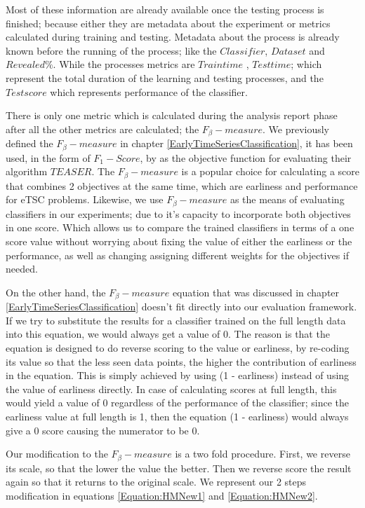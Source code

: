 Most of these information are already available once the testing process is finished; because either they are metadata about the experiment or metrics calculated during training and testing.
Metadata about the process is already known before the running of the process; like the $Classifier$, $Data set$ and $Revealed \%$.
While the processes metrics are $Train time$ , $Test time$; which represent the total duration of the learning and testing processes, and the $Test score$ which represents performance of the classifier.


There is only one metric which is calculated during the analysis report phase after all the other metrics are calculated; the $F_{\beta}-measure$.
We previously defined the $F_{\beta}-measure$ in chapter \ref{EarlyTimeSeriesClassification}, it has been used, in the form of $F_{1}-Score$, by \cite{schafer2020teaser} as the objective function for evaluating their algorithm $TEASER$.
The $F_{\beta}-measure$ is a popular choice for calculating a score that combines 2 objectives at the same time, which are earliness and performance for eTSC problems.
Likewise, we use $F_{\beta}-measure$ as the means of evaluating classifiers in our experiments; due to it's capacity to incorporate both objectives in one score.
Which allows us to compare the trained classifiers in terms of a one score value without worrying about fixing the value of either the earliness or the performance,
as well as changing assigning different weights for the objectives if needed.


On the other hand, the $F_{\beta}-measure$ equation that was discussed in chapter \ref{EarlyTimeSeriesClassification} doesn't fit directly into our evaluation framework.
If we try to substitute the results for a classifier trained on the full length data into this equation, we would always get a value of 0.
The reason is that the equation is designed to do reverse scoring to the value or earliness, by re-coding its value so that the less seen data points, the higher the contribution of earliness in the equation.
This is simply achieved by using (1 - earliness) instead of using the value of earliness directly.
In case of calculating scores at full length, this would yield a value of 0 regardless of the performance of the classifier;
since the earliness value at full length is 1, then the equation (1 - earliness) would always give a 0 score causing the numerator to be 0.

Our modification to the $F_{\beta}-measure$ is a two fold procedure.
First, we reverse its scale, so that the lower the value the better. Then we reverse score the result again so that it returns to the original scale.
We represent our 2 steps modification in equations \ref{Equation:HMNew1} and \ref{Equation:HMNew2}.

